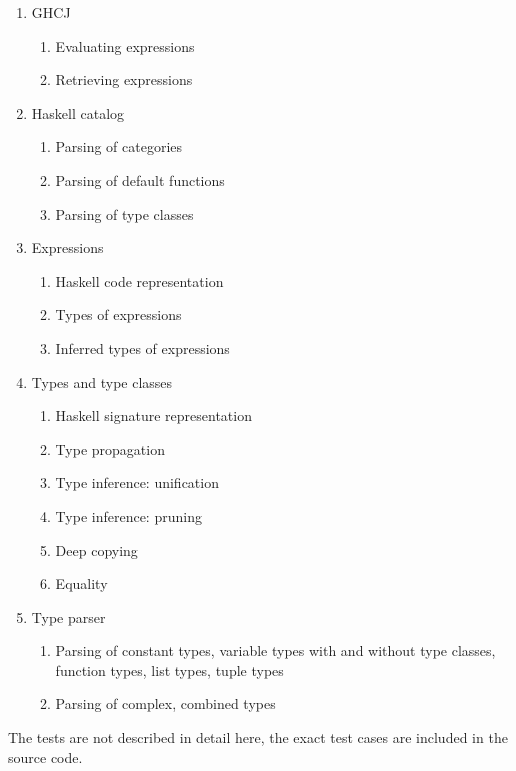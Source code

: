 \begin{enumerate}
	\item GHCJ
	\begin{enumerate}
		\item Evaluating expressions
		\item Retrieving expressions
	\end{enumerate}
	\item Haskell catalog
	\begin{enumerate}
		\item Parsing of categories
		\item Parsing of default functions
		\item Parsing of type classes
	\end{enumerate}
	\item Expressions
	\begin{enumerate}
		\item Haskell code representation
		\item Types of expressions
		\item Inferred types of expressions
	\end{enumerate}
	\item Types and type classes
	\begin{enumerate}
		\item Haskell signature representation
		\item Type propagation
		\item Type inference: unification
		\item Type inference: pruning
		\item Deep copying
		\item Equality
	\end{enumerate}
	\item Type parser
	\begin{enumerate}
		\item Parsing of constant types, variable types with and without type classes, function types, list types, tuple types
		\item Parsing of complex, combined types
	\end{enumerate}
\end{enumerate}

The tests are not described in detail here, the exact test cases are included in the source code.
